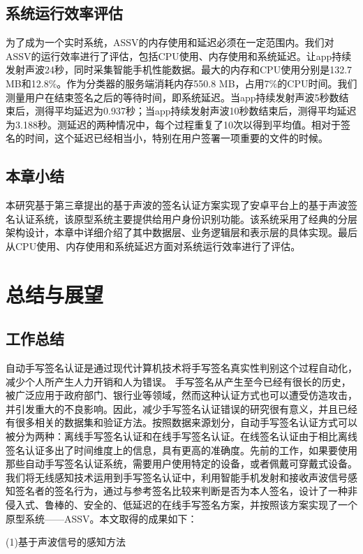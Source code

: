 \section{系统运行效率评估}
为了成为一个实时系统，ASSV的内存使用和延迟必须在一定范围内。我们对ASSV的运行效率进行了评估，包括CPU使用、内存使用和系统延迟。让app持续发射声波24秒，同时采集智能手机性能数据。最大的内存和CPU使用分别是132.7 MB和12.8\%。作为分类器的服务端消耗内存550.8 MB，占用7\%的CPU时间。我们测量用户在结束签名之后的等待时间，即系统延迟。当app持续发射声波5秒数结束后，测得平均延迟为0.937秒；当app持续发射声波10秒数结束后，测得平均延迟为3.188秒。测延迟的两种情况中，每个过程重复了10次以得到平均值。相对于签名的时间，这个延迟已经相当小，特别在用户签署一项重要的文件的时候。

\section{本章小结}
本研究基于第三章提出的基于声波的签名认证方案实现了安卓平台上的基于声波签名认证系统，该原型系统主要提供给用户身份识别功能。该系统采用了经典的分层架构设计，本章中详细介绍了其中数据层、业务逻辑层和表示层的具体实现。最后从CPU使用、内存使用和系统延迟方面对系统运行效率进行了评估。

\chapter{总结与展望}

\section{工作总结}

自动手写签名认证是通过现代计算机技术将手写签名真实性判别这个过程自动化，减少个人所产生人力开销和人为错误。 手写签名从产生至今已经有很长的历史，被广泛应用于政府部门、银行业等领域，然而这种认证方式也可以遭受仿造攻击，并引发重大的不良影响。因此，减少手写签名认证错误的研究很有意义，并且已经有很多相关的数据集和验证方法。按照数据来源划分，自动手写签名认证方式可以被分为两种：离线手写签名认证和在线手写签名认证。在线签名认证由于相比离线签名认证多出了时间维度上的信息，具有更高的准确度。先前的工作，如果要使用那些自动手写签名认证系统，需要用户使用特定的设备，或者佩戴可穿戴式设备。我们将无线感知技术运用到手写签名认证中，利用智能手机发射和接收声波信号感知签名者的签名行为，通过与参考签名比较来判断是否为本人签名，设计了一种非侵入式、鲁棒的、安全的、低延迟的在线手写签名方案，并按照该方案实现了一个原型系统——ASSV。本文取得的成果如下：

(1)基于声波信号的感知方法


